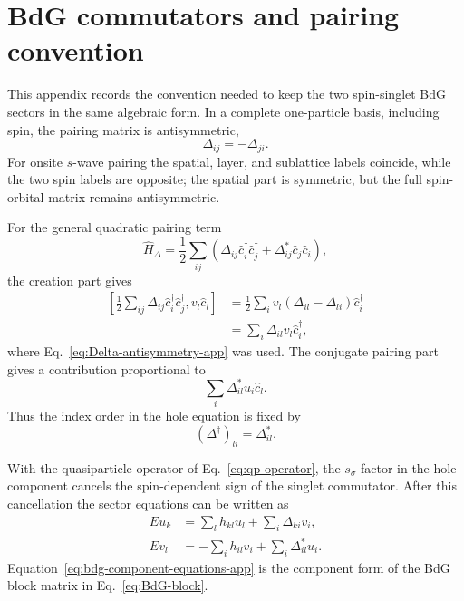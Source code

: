 \section{BdG commutators and pairing convention}
\label{app:bdg-commutators}

This appendix records the convention needed to keep the two spin-singlet BdG sectors in the same algebraic form.  In a complete one-particle basis, including spin, the pairing matrix is antisymmetric,
\begin{equation}
    \Delta_{ij}=-\Delta_{ji}.
    \label{eq:Delta-antisymmetry-app}
\end{equation}
For onsite $s$-wave pairing the spatial, layer, and sublattice labels coincide, while the two spin labels are opposite; the spatial part is symmetric, but the full spin-orbital matrix remains antisymmetric.

For the general quadratic pairing term
\begin{equation}
    \hat H_\Delta
    =
    \frac12\sum_{ij}
    \left(
        \Delta_{ij}\hat c_i^\dagger\hat c_j^\dagger
        +
        \Delta_{ij}^*\hat c_j\hat c_i
    \right),
\end{equation}
the creation part gives
\begin{align}
    \left[
        \frac12\sum_{ij}\Delta_{ij}\hat c_i^\dagger\hat c_j^\dagger,
        v_l\hat c_l
    \right]
    &=
    \frac12\sum_i v_l\left(\Delta_{il}-\Delta_{li}\right)\hat c_i^\dagger
    \\
    &=
    \sum_i \Delta_{il}v_l\hat c_i^\dagger,
    \label{eq:creation-pairing-comm}
\end{align}
where Eq.~\eqref{eq:Delta-antisymmetry-app} was used.  The conjugate pairing part gives a contribution proportional to
\begin{equation}
    \sum_i \Delta^*_{il}u_i\hat c_l.
    \label{eq:conjugate-pairing-index}
\end{equation}
Thus the index order in the hole equation is fixed by
\begin{equation}
    (\Delta^\dagger)_{li}=\Delta^*_{il}.
    \label{eq:Ddagger-index}
\end{equation}

With the quasiparticle operator of Eq.~\eqref{eq:qp-operator}, the $s_\sigma$ factor in the hole component cancels the spin-dependent sign of the singlet commutator.  After this cancellation the sector equations can be written as
\begin{align}
    E u_k
    &=
    \sum_l h_{kl}u_l+
    \sum_i \Delta_{ki}v_i,
    \\
    E v_l
    &=
    -\sum_i h_{il}v_i+
    \sum_i \Delta^*_{il}u_i.
    \label{eq:bdg-component-equations-app}
\end{align}
Equation~\eqref{eq:bdg-component-equations-app} is the component form of the BdG block matrix in Eq.~\eqref{eq:BdG-block}.
